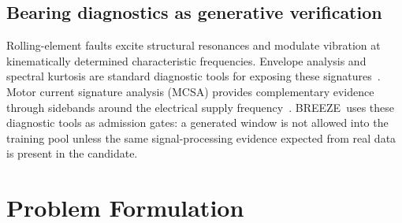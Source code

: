 \documentclass[review,3p,times]{elsarticle}
\newcommand{\breeze}{BREEZE}
\begin{document}
\subsection{Bearing diagnostics as generative verification}

Rolling-element faults excite structural resonances and modulate vibration at
kinematically determined characteristic frequencies. Envelope analysis and
spectral kurtosis are standard diagnostic tools for exposing these
signatures~\cite{randall,antoni,antoni_kurtogram}. Motor current signature
analysis (MCSA) provides complementary evidence through sidebands around the
electrical supply frequency~\cite{schoen}. \breeze\ uses these diagnostic
tools as admission gates: a generated window is not allowed into the training
pool unless the same signal-processing evidence expected from real data is
present in the candidate.

\section{Problem Formulation}
\label{sec:problem}
\end{document}
